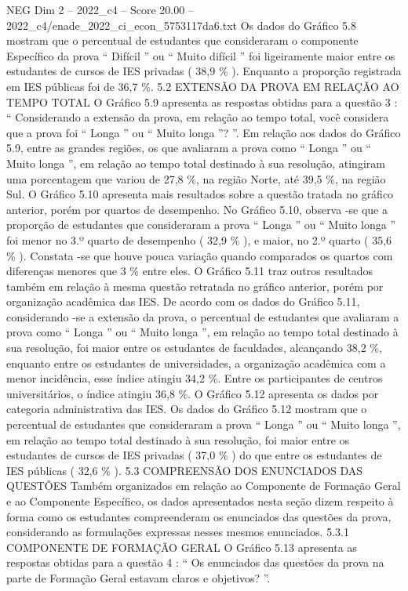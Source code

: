 \begin{textsample}{NEG Dim 2 – 2022\_c4 – Score 20.00 – 2022\_c4/enade\_2022\_ci\_econ\_5753117da6.txt}
Os dados do Gráfico 5.8 mostram que o percentual de estudantes que consideraram o componente Específico da prova “ Difícil ” ou “ Muito difícil ” foi ligeiramente maior entre os estudantes de cursos de IES privadas ( 38,9 \% ).
Enquanto a proporção registrada em IES públicas foi de 36,7 \%. 5.2 EXTENSÃO DA PROVA EM RELAÇÃO AO TEMPO TOTAL O Gráfico 5.9 apresenta as respostas obtidas para a questão 3 : “ Considerando a extensão da prova, em relação ao tempo total, você considera que a prova foi “ Longa ” ou “ Muito longa ”? ”.
Em relação aos dados do Gráfico 5.9, entre as grandes regiões, os que avaliaram a prova como “ Longa ” ou “ Muito longa ”, em relação ao tempo total destinado à sua resolução, atingiram uma porcentagem que variou de 27,8 \%, na região Norte, até 39,5 \%, na região Sul.
O Gráfico 5.10 apresenta mais resultados sobre a questão tratada no gráfico anterior, porém por quartos de desempenho.
No Gráfico 5.10, observa -se que a proporção de estudantes que consideraram a prova “ Longa ” ou “ Muito longa ” foi menor no 3.º quarto de desempenho ( 32,9 \% ), e maior, no 2.º quarto ( 35,6 \% ).
Constata -se que houve pouca variação quando comparados os quartos com diferenças menores que 3 \% entre eles.
O Gráfico 5.11 traz outros resultados também em relação à mesma questão retratada no gráfico anterior, porém por organização acadêmica das IES.
De acordo com os dados do Gráfico 5.11, considerando -se a extensão da prova, o percentual de estudantes que avaliaram a prova como “ Longa ” ou “ Muito longa ”, em relação ao tempo total destinado à sua resolução, foi maior entre os estudantes de faculdades, alcançando 38,2 \%, enquanto entre os estudantes de universidades, a organização acadêmica com a menor incidência, esse índice atingiu 34,2 \%.
Entre os participantes de centros universitários, o índice atingiu 36,8 \%.
O Gráfico 5.12 apresenta os dados por categoria administrativa das IES.
Os dados do Gráfico 5.12 mostram que o percentual de estudantes que consideraram a prova “ Longa ” ou “ Muito longa ”, em relação ao tempo total destinado à sua resolução, foi maior entre os estudantes de cursos de IES privadas ( 37,0 \% ) do que entre os estudantes de IES públicas ( 32,6 \% ). 5.3 COMPREENSÃO DOS ENUNCIADOS DAS QUESTÕES Também organizados em relação ao Componente de Formação Geral e ao Componente Específico, os dados apresentados nesta seção dizem respeito à forma como os estudantes compreenderam os enunciados das questões da prova, considerando as formulações expressas nesses mesmos enunciados. 5.3.1 COMPONENTE DE FORMAÇÃO GERAL O Gráfico 5.13 apresenta as respostas obtidas para a questão 4 : “ Os enunciados das questões da prova na parte de Formação Geral estavam claros e objetivos? ”.

\end{textsample}

